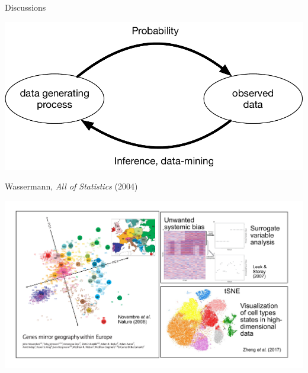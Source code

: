 \documentclass[
  ignorenonframetext,
  aspectratio=169]{beamer}
\begin{document}
\begin{frame}{Discussions}
\protect\hypertarget{discussions}{}
\scriptsize

\begin{center}\includegraphics[width=.7\linewidth]{./Vis/unsupervised/model_based_inference} \end{center}

\normalsize

\vfill

\tiny

Wassermann, \emph{All of Statistics} (2004)
\end{frame}

\begin{frame}{}
\protect\hypertarget{section-2}{}
\includegraphics{Vis/unsupervised/why_unsupervised_learning.pdf}
\end{frame}
\end{document}
